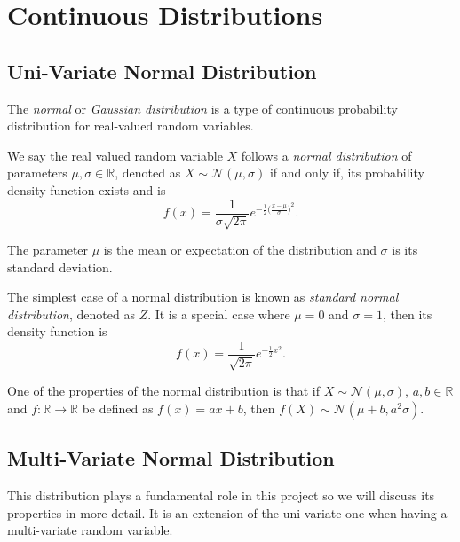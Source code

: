 \section{Continuous Distributions}

\subsection*{Uni-Variate Normal Distribution}

The \emph{normal} or \emph{Gaussian distribution} is a type of continuous
probability distribution for real-valued random variables.

\begin{definition}
  We say the real valued random variable \(X\) follows a \emph{normal distribution} of
  parameters \(\mu, \sigma \in \mathbb{R}\), denoted as \(X \sim \mathcal{N}(\mu,
  \sigma)\) if and only if, its probability density function exists and is
  \[
    f(x) = \frac{1}{\sigma \sqrt{2\pi}} e^{-\frac{1}{2}\big(\frac{x-\mu}{\sigma} \big)^2}.
  \]

  The parameter \(\mu\) is the mean or expectation of the distribution and
  \(\sigma\) is its standard deviation.

\end{definition}

The simplest case of a normal distribution is known as \emph{standard normal
  distribution}, denoted as \(Z\). It is a special case where \(\mu = 0\) and \(\sigma = 1\), then
its density function is
\[
  f(x) = \frac{1}{\sqrt{2\pi}}e^{-\frac{1}{2}x^2}.
\]

One of the properties of the normal distribution is that if \(X \sim \mathcal{N}(\mu, \sigma)\), \(a,b \in \mathbb{R}\) and \(f:\mathbb{R} \to \mathbb{R}\) be defined
as \(f(x) = ax + b\), then \(f(X) \sim \mathcal{N}(\mu + b, a^2 \sigma)\).

\subsection*{Multi-Variate Normal Distribution}

This distribution plays a fundamental role in this project so we will discuss
its properties in more detail. It is an extension of the uni-variate one when having a
multi-variate random variable.

